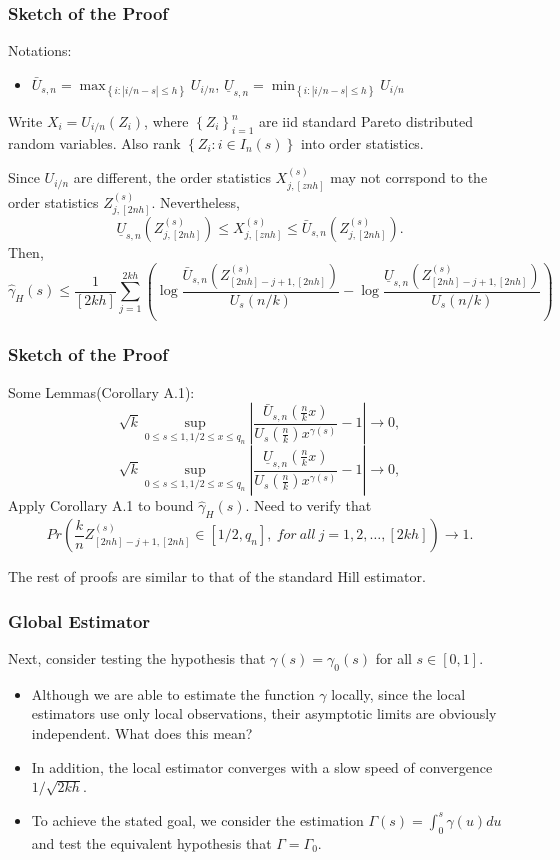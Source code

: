 \documentclass{beamer}
\newcommand{\suit}[1]{\left(#1\right)}
\newcommand{\abs}[1]{\left\vert#1\right\vert}
\newcommand{\set}[1]{\left\{#1\right\}}
\begin{document}
\begin{frame}
    \frametitle{Sketch of the Proof}
Notations:
    \begin{itemize}
        \item $\bar{U}_{s,n}=\max_{\set{i:\abs{i/n-s}\le h}} U_{i/n}$, $\underline{U}_{s,n}=\min_{\set{i:\abs{i/n-s}\le h}} U_{i/n}$
    \end{itemize}

Write  $X_i = U_{i/n}(Z_i)$, where $\set{Z_i}_{i=1}^n$ are iid standard Pareto distributed random variables. Also rank $\set{Z_i: i\in I_n(s)}$ into order statistics. 

{\color{blue} Since $U_{i/n}$ are different, the order statistics $X_{j,[znh]}^{(s)}$ may not corrspond to the order statistics $Z_{j,[2nh]}^{(s)}$.}
{\color{red}
Nevertheless, 
$$
\underline{U}_{s,n}(Z_{j,[2nh]}^{(s)}) \le X_{j,[znh]}^{(s)} \le \bar{U}_{s,n}(Z_{j,[2nh]}^{(s)}).
$$
}
Then,
$$
\hat{\gamma}_H(s)\le \frac{1}{[2kh]}\sum_{j=1}^{2kh} \suit{\log \frac{\bar{U}_{s,n}(Z_{[2nh]-j+1,[2nh]}^{(s)})}{U_s(n/k)} -\log \frac{\underline{U}_{s,n}(Z_{[2nh]-j+1,[2nh]}^{(s)})}{U_s(n/k)}}
$$
\end{frame}

\begin{frame}
    \frametitle{Sketch of the Proof}
Some Lemmas(Corollary A.1):
$$
\sqrt{k}\sup_{0\le s\le 1, 1/2\le x \le q_n} \abs{\frac{\bar{U}_{s,n}(\frac{n}{k}x)}{U_s(\frac{n}{k})x^{\gamma(s)}}-1} \to 0,
$$
$$
\sqrt{k}\sup_{0\le s\le 1, 1/2\le x \le q_n} \abs{\frac{\underline{U}_{s,n}(\frac{n}{k}x)}{U_s(\frac{n}{k})x^{\gamma(s)}}-1} \to 0,
$$
Apply Corollary A.1 to bound $\hat{\gamma}_H(s)$. 
{\color{blue} Need to verify that
$$
Pr\suit{\frac{k}{n} Z_{[2nh]-j+1,[2nh]}^{(s)} \in [1/2,q_n], \ for \ all \ j=1,2,\dots,[2kh]} \to 1.
$$}

The rest of proofs are similar to that of the standard Hill estimator.
\end{frame}


\begin{frame}
    \frametitle{Global Estimator}
Next, consider testing the hypothesis that $\gamma(s)=\gamma_0(s)$ for all $s\in [0,1]$.

\bigskip

\begin{itemize}
    \item Although we are able to estimate the function $\gamma$ locally, since the local estimators use only local observations, their asymptotic limits are obviously independent. {\color{red} What does this mean?}
    \item In addition, the local estimator converges with a slow speed of convergence $1/\sqrt{2kh}$.
    \item  To achieve the stated goal, we consider the estimation $\Gamma(s)=\int_{0}^{s}\gamma(u)du$ and test the equivalent hypothesis that $\Gamma=\Gamma_0$.
\end{itemize}
\end{frame}
\end{document}

